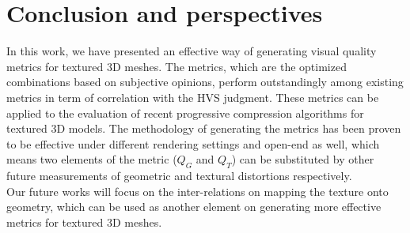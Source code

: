 \section{Conclusion and perspectives}
In this work, we have presented an effective way of generating visual quality metrics for textured 3D meshes. The metrics, which are the optimized combinations based on subjective opinions, perform outstandingly among existing metrics in term of correlation with the HVS judgment.  These metrics can be applied to the evaluation of recent progressive compression algorithms for textured 3D models. The methodology of generating the metrics has been proven to be effective under different rendering settings and open-end as well, which means two elements of the metric ($Q_G$ and $Q_T$) can be substituted by other future measurements of geometric and textural distortions respectively.  \\
Our future works will focus on the inter-relations on mapping the texture onto geometry, which can be used as another element on generating more effective metrics for textured 3D meshes.